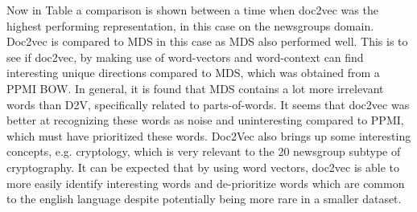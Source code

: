 Now in Table \label{ch3:compared2vmds} a comparison is shown between a time when doc2vec was the highest performing representation, in this case on the newsgroups domain. Doc2vec is compared to MDS in this case as MDS also performed well. This is to see if doc2vec, by making use of word-vectors and word-context can find interesting unique directions compared to MDS, which was obtained from a PPMI BOW. In general, it is found that MDS contains a lot more irrelevant words than D2V, specifically related to parts-of-words. It seems that doc2vec was better at recognizing these words as noise and uninteresting compared to PPMI, which must have prioritized these words. Doc2Vec also brings up some interesting concepts, e.g. cryptology, which is very relevant to the 20 newsgroup subtype of cryptography. It can be expected that by using word vectors, doc2vec is able to more easily identify interesting words and de-prioritize words which are common to the english language despite potentially being more rare in a smaller dataset.

